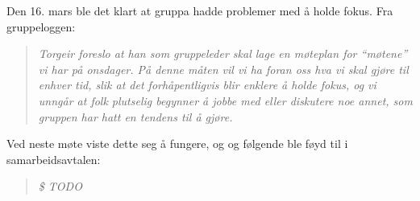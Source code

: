 Den 16. mars ble det klart at gruppa hadde problemer med å holde fokus. Fra gruppeloggen:

\begin{quotation}
\emph{
	Torgeir foreslo at han som gruppeleder skal lage en møteplan for “møtene” vi har på onsdager. 
	På denne måten vil vi ha foran oss hva vi skal gjøre til enhver tid, 
	slik at det forhåpentligvis blir enklere å holde fokus, 
	og vi unngår at folk plutselig begynner å jobbe med eller diskutere noe annet, 
	som gruppen har hatt en tendens til å gjøre.
}
\end{quotation}
Ved neste møte viste dette seg å fungere, og og følgende ble føyd til i samarbeidsavtalen:
\begin {quotation}
\emph{
	\$ TODO
}
\end{quotation}
